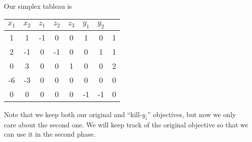 \documentclass[a4paper]{article}
\begin{document}
\begin{eg}
  Our simplex tableau is
  \begin{center}
    \begin{tabular}{cccccccc}
      \toprule
      $x_1$ & $x_2$ & $z_1$ & $z_2$ & $z_3$ & $y_1$ & $y_2$ \\
      \midrule
      1 & 1 & -1 & 0 & 0 & 1 & 0 & 1\\
      2 & -1 & 0 & -1 & 0 & 0 & 1 & 1\\
      0 & 3 & 0 & 0 & 1 & 0 & 0 & 2\\
      \midrule
      -6 & -3 & 0 & 0 & 0 & 0 & 0 & 0\\
      0 & 0 & 0 & 0 & 0 & -1 & -1 & 0\\
      \bottomrule
    \end{tabular}
  \end{center}
  Note that we keep both our original and ``kill-$y_i$'' objectives, but now we only care about the second one. We will keep track of the original objective so that we can use it in the second phase.


\end{eg}
\end{document}
